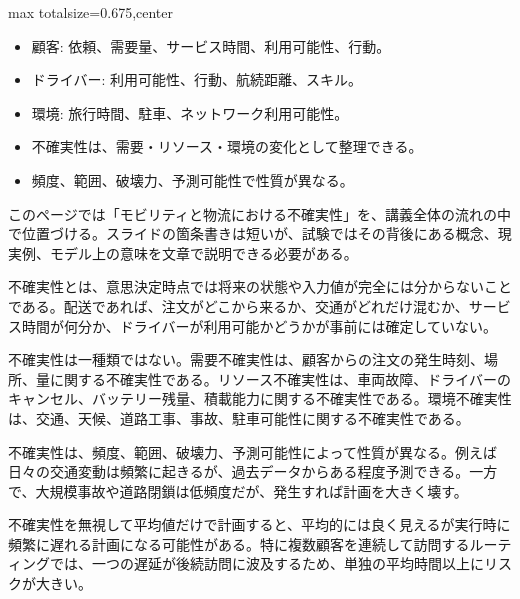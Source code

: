 \clearpage
{}
\begin{adjustbox}{max totalsize={\textwidth}{0.675\textheight},center}
\begin{minipage}{\textwidth}\scriptsize
\begin{minipage}[t]{0.485\textwidth}
\begin{itemize}
\item 顧客: 依頼、需要量、サービス時間、利用可能性、行動。
\item ドライバー: 利用可能性、行動、航続距離、スキル。
\item 環境: 旅行時間、駐車、ネットワーク利用可能性。
\end{itemize}
\begin{itemize}
\item 不確実性は、需要・リソース・環境の変化として整理できる。
\item 頻度、範囲、破壊力、予測可能性で性質が異なる。
\end{itemize}
\end{minipage}\hfill
\begin{minipage}[t]{0.485\textwidth}
このページでは「モビリティと物流における不確実性」を、講義全体の流れの中で位置づける。スライドの箇条書きは短いが、試験ではその背後にある概念、現実例、モデル上の意味を文章で説明できる必要がある。\par
不確実性とは、意思決定時点では将来の状態や入力値が完全には分からないことである。配送であれば、注文がどこから来るか、交通がどれだけ混むか、サービス時間が何分か、ドライバーが利用可能かどうかが事前には確定していない。\par
不確実性は一種類ではない。需要不確実性は、顧客からの注文の発生時刻、場所、量に関する不確実性である。リソース不確実性は、車両故障、ドライバーのキャンセル、バッテリー残量、積載能力に関する不確実性である。環境不確実性は、交通、天候、道路工事、事故、駐車可能性に関する不確実性である。\par
不確実性は、頻度、範囲、破壊力、予測可能性によって性質が異なる。例えば日々の交通変動は頻繁に起きるが、過去データからある程度予測できる。一方で、大規模事故や道路閉鎖は低頻度だが、発生すれば計画を大きく壊す。\par
不確実性を無視して平均値だけで計画すると、平均的には良く見えるが実行時に頻繁に遅れる計画になる可能性がある。特に複数顧客を連続して訪問するルーティングでは、一つの遅延が後続訪問に波及するため、単独の平均時間以上にリスクが大きい。\par

\end{minipage}
\end{minipage}
\end{adjustbox}
